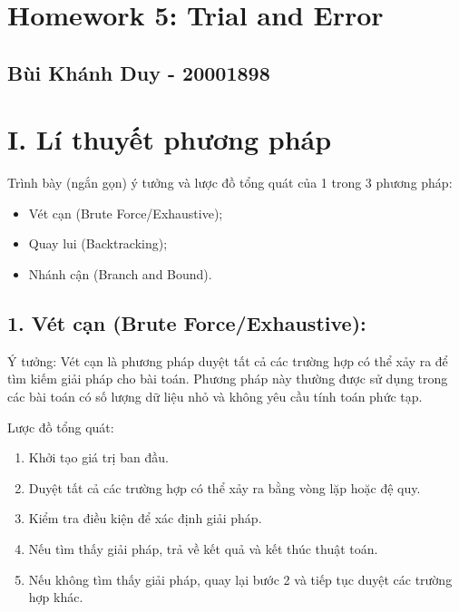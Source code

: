 \documentclass[
]{article}
\author{}
\date{\vspace{-2.5em}}
\providecommand{\tightlist}{%
  \setlength{\itemsep}{0pt}\setlength{\parskip}{0pt}}
\begin{document}
{
\setcounter{tocdepth}{2}
\tableofcontents
}
\hypertarget{homework-5-trial-and-error}{%
\section{Homework 5: Trial and Error}\label{homework-5-trial-and-error}}

\hypertarget{buxf9i-khuxe1nh-duy---20001898}{%
\subsection{Bùi Khánh Duy -
20001898}\label{buxf9i-khuxe1nh-duy---20001898}}

\hypertarget{i.-luxed-thuyux1ebft-phux1b0ux1a1ng-phuxe1p}{%
\section{I. Lí thuyết phương
pháp}\label{i.-luxed-thuyux1ebft-phux1b0ux1a1ng-phuxe1p}}

Trình bày (ngắn gọn) ý tưởng và lược đồ tổng quát của 1 trong 3 phương
pháp:

\begin{itemize}
\tightlist
\item
  Vét cạn (Brute Force/Exhaustive);
\item
  Quay lui (Backtracking);
\item
  Nhánh cận (Branch and Bound).
\end{itemize}

\hypertarget{vuxe9t-cux1ea1n-brute-forceexhaustive}{%
\subsection{1. Vét cạn (Brute
Force/Exhaustive):}\label{vuxe9t-cux1ea1n-brute-forceexhaustive}}

Ý tưởng: Vét cạn là phương pháp duyệt tất cả các trường hợp có thể xảy
ra để tìm kiếm giải pháp cho bài toán. Phương pháp này thường được sử
dụng trong các bài toán có số lượng dữ liệu nhỏ và không yêu cầu tính
toán phức tạp.

Lược đồ tổng quát:

\begin{enumerate}
\def\labelenumi{\arabic{enumi}.}
\tightlist
\item
  Khởi tạo giá trị ban đầu.
\item
  Duyệt tất cả các trường hợp có thể xảy ra bằng vòng lặp hoặc đệ quy.
\item
  Kiểm tra điều kiện để xác định giải pháp.
\item
  Nếu tìm thấy giải pháp, trả về kết quả và kết thúc thuật toán.
\item
  Nếu không tìm thấy giải pháp, quay lại bước 2 và tiếp tục duyệt các
  trường hợp khác.
\end{enumerate}
\end{document}

